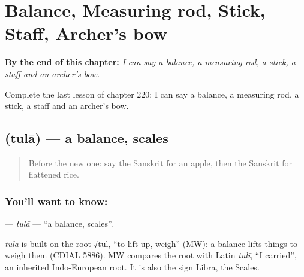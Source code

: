 
\chapter{Balance, Measuring rod, Stick, Staff, Archer's bow}
\label{ch:sa-balance-measuring-rod-stick-staff-archer-s-bow}

\begin{chapteropening}
\textbf{By the end of this chapter:} \emph{I can say a balance, a measuring rod, a stick, a staff and an archer's bow.}

Complete the last lesson of chapter 220: I can say a balance, a measuring rod, a stick, a staff and an archer's bow.
\end{chapteropening}

\section[\texorpdfstring{\sk{तुला} (tulā)}{तुला (tulā)}]{ (tulā) — a balance, scales}

\label{lesson:SA-C220-tula}



\begin{quote}
Before the new one: say the Sanskrit for an apple, then the Sanskrit for flattened rice.
\end{quote}

\subsection*{You'll want to know: }
\textbf{} — \emph{tulā} — \textquotedblleft{}a balance, scales\textquotedblright{}.

\begin{cousinweb}
\emph{tulā} is built on the root √tul, \textquotedblleft{}to lift up, weigh\textquotedblright{} (MW): a balance lifts things to weigh them (CDIAL 5886). MW compares the root with Latin \emph{tulī}, \textquotedblleft{}I carried\textquotedblright{}, an inherited Indo-European root. It is also the sign Libra, the Scales.
\end{cousinweb}

